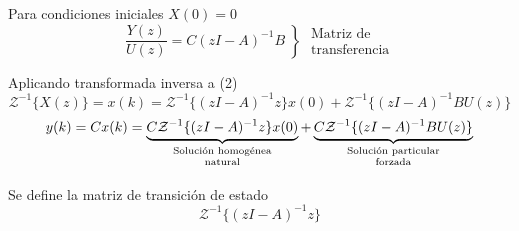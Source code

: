 Para condiciones iniciales \( X(0) = 0 \)
\[
    \frac{Y(z)}{U(z)} = C(zI-A)^{-1}B 
    \left\}
            \begin{array}{lll}
                \text{Matriz de} \\
                \text{transferencia}
            \end{array}
    \right.
\]

Aplicando transformada inversa a (2)
\[
    \mathcal{Z}^{-1} \{ X(z) \} = x(k) = \mathcal{Z}^{-1} \{ (zI-A)^{-1}z \}x(0) + \mathcal{Z}^{-1} \{ (zI-A)^{-1}BU(z) \}
\]
\[
    y(k) = Cx(k) = 
    \underbrace{C \mathcal{Z}^{-1} \{ (zI-A)^{-1}z \}x(0)}_
    {
        \begin{scriptsize}
            \begin{matrix}
                \text{Solución homogénea}\\
                \text{natural}\\
            \end{matrix}
        \end{scriptsize}
    }+ 
    \underbrace{C \mathcal{Z}^{-1} \{ (zI-A)^{-1}BU(z) \}}_
    {
        \begin{scriptsize}
            \begin{matrix}
                \text{Solución particular}\\
                \text{forzada}\\
            \end{matrix}
        \end{scriptsize}
    }
\]

Se define la matriz de transición de estado
\[
    \mathcal{Z}^{-1} \{ (zI-A)^{-1} z \}
\]